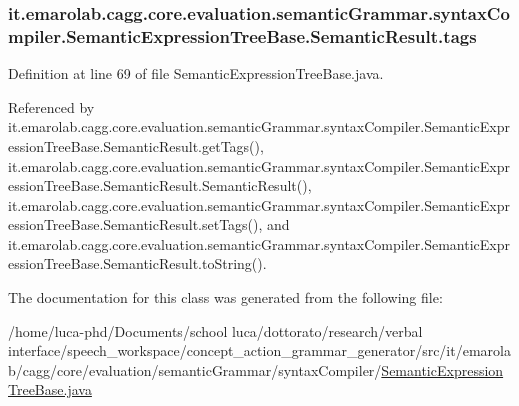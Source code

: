 \hypertarget{classit_1_1emarolab_1_1cagg_1_1core_1_1evaluation_1_1semanticGrammar_1_1syntaxCompiler_1_1Semant5d395032261986aec1b33357dd21b6bb_ac6d9e2acfcce1dded907f7051fecf5a2}{
\subsubsection[{tags}]{ it.\-emarolab.\-cagg.\-core.\-evaluation.\-semantic\-Grammar.\-syntax\-Compiler.\-Semantic\-Expression\-Tree\-Base.\-Semantic\-Result.\-tags\hspace{0.3cm}{\ttfamily [private]}}}\label{classit_1_1emarolab_1_1cagg_1_1core_1_1evaluation_1_1semanticGrammar_1_1syntaxCompiler_1_1Semant5d395032261986aec1b33357dd21b6bb_ac6d9e2acfcce1dded907f7051fecf5a2}


Definition at line 69 of file Semantic\-Expression\-Tree\-Base.\-java.



Referenced by it.\-emarolab.\-cagg.\-core.\-evaluation.\-semantic\-Grammar.\-syntax\-Compiler.\-Semantic\-Expression\-Tree\-Base.\-Semantic\-Result.\-get\-Tags(), it.\-emarolab.\-cagg.\-core.\-evaluation.\-semantic\-Grammar.\-syntax\-Compiler.\-Semantic\-Expression\-Tree\-Base.\-Semantic\-Result.\-Semantic\-Result(), it.\-emarolab.\-cagg.\-core.\-evaluation.\-semantic\-Grammar.\-syntax\-Compiler.\-Semantic\-Expression\-Tree\-Base.\-Semantic\-Result.\-set\-Tags(), and it.\-emarolab.\-cagg.\-core.\-evaluation.\-semantic\-Grammar.\-syntax\-Compiler.\-Semantic\-Expression\-Tree\-Base.\-Semantic\-Result.\-to\-String().



The documentation for this class was generated from the following file\-:\begin{DoxyCompactItemize}
\item 
/home/luca-\/phd/\-Documents/school luca/dottorato/research/verbal interface/speech\-\_\-workspace/concept\-\_\-action\-\_\-grammar\-\_\-generator/src/it/emarolab/cagg/core/evaluation/semantic\-Grammar/syntax\-Compiler/\hyperlink{SemanticExpressionTreeBase_8java}{Semantic\-Expression\-Tree\-Base.\-java}\end{DoxyCompactItemize}
